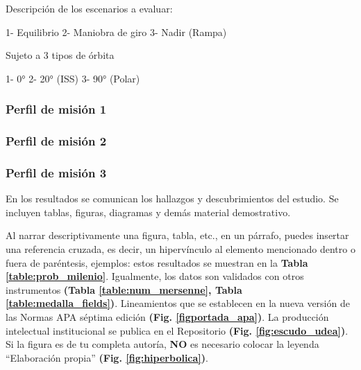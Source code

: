 Descripción de los escenarios a evaluar:

1- Equilibrio  
2- Maniobra de giro
3- Nadir (Rampa)

Sujeto a 3 tipos de órbita 

1- 0°
2- 20° (ISS)
3- 90° (Polar)
\subsubsection{Perfil de misión 1}
\subsubsection{Perfil de misión 2} 
\subsubsection{Perfil de misión 3}  


En los resultados se comunican los hallazgos y descubrimientos del estudio. Se incluyen tablas, figuras, diagramas y demás material demostrativo.




 Al narrar descriptivamente una figura, tabla, etc., en un párrafo, puedes insertar una referencia cruzada, es decir, un hipervínculo al elemento mencionado dentro o fuera de paréntesis, ejemplos: estos resultados se muestran en la \textbf{Tabla \ref{table:prob_milenio}}.  Igualmente, los datos son validados con otros instrumentos \textbf{(Tabla \ref{table:num_mersenne}, Tabla \ref{table:medalla_fields})}. Lineamientos que se establecen en la nueva versión de las Normas APA séptima edición \textbf{(Fig. \ref{figportada_apa})}. La producción intelectual institucional se publica en el Repositorio \textbf{(Fig. \ref{fig:escudo_udea})}. Si la figura es de tu completa autoría, \textbf{NO} es necesario colocar la leyenda “Elaboración propia” \textbf{(Fig. \ref{fig:hiperbolica})}.


